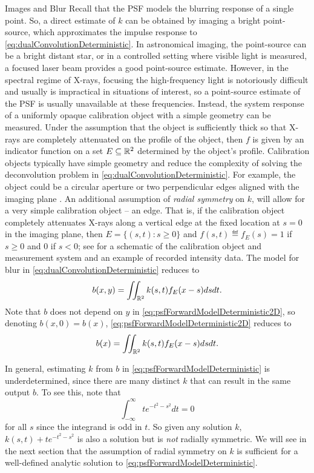 \begin{chapter}{Images and Blur}
  Recall that the PSF models the blurring response of a single point.
  So, a direct estimate of $k$ can be obtained by imaging a bright point-source, which approximates the impulse response to \eqref{eq:dualConvolutionDeterministic}.
  In astronomical imaging, the point-source can be a bright distant star, or in a controlled setting where visible light is measured, a focused laser beam provides a good point-source estimate.
  However, in the spectral regime of X-rays, focusing the high-frequency light is notoriously difficult and usually is impractical in situations of interest, so a point-source estimate of the PSF is usually unavailable at these frequencies.
  Instead, the system response of a uniformly opaque calibration object with a simple geometry can be measured.
  Under the assumption that the object is sufficiently thick so that X-rays are completely attenuated on the profile of the object, then $f$ is given by an indicator function on a set $E \subseteq \mathbb R^2$ determined by the object's profile.
  Calibration objects typically have simple geometry and reduce the complexity of solving the deconvolution problem in \eqref{eq:dualConvolutionDeterministic}.  
  For example, the object could be a circular aperture or two perpendicular edges aligned with the imaging plane \citep{doering1992,watson1993}.
  An additional assumption of \emph{radial symmetry} on $k$, will allow for a very simple calibration object -- an edge. 
  That is, if the calibration object completely attenuates X-rays along a vertical edge at the fixed location at $s=0$ in the imaging plane, then $E=\{(s,t):s\ge0\}$ and $f(s,t) \eqdef f_E(s) = 1$ if $s\ge0$ and $0$ if $s <0$; see  for a schematic of the calibration object and measurement system and an example of recorded intensity data.
  The model for blur in \eqref{eq:dualConvolutionDeterministic} reduces to
\begin{equation}\label{eq:psfForwardModelDeterministic2D}
  b(x,y) = \iint_{\mathbb R^2} k(s,t) f_E(x-s)dsdt. 
\end{equation}
  Note that $b$ does not depend on $y$ in \eqref{eq:psfForwardModelDeterministic2D}, so denoting $b(x,0) = b(x)$, \eqref{eq:psfForwardModelDeterministic2D} reduces to
\begin{equation}\label{eq:psfForwardModelDeterministic}
  b(x) = \iint_{\mathbb R^2} k(s,t) f_E(x-s)dsdt. 
\end{equation} 
  
  In general, estimating $k$ from $b$ in \eqref{eq:psfForwardModelDeterministic} is underdetermined, since there are many distinct $k$ that can result in the same output $b$.
  To see this, note that 
  \begin{equation}
    \int_{-\infty}^{\infty} te^{-t^2 - s^2}dt = 0
  \end{equation}
  for all $s$ since the integrand is odd in $t$.
  So given any solution $k$, $k(s,t)+te^{-t^2 - s^2}$ is also a solution but is \emph{not} radially symmetric.
  We will see in the next section that the assumption of radial symmetry on $k$ is sufficient for a well-defined analytic solution to \eqref{eq:psfForwardModelDeterministic}.


\end{chapter}
